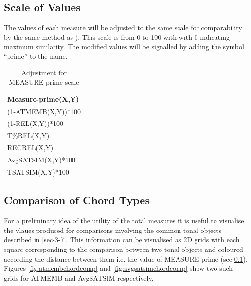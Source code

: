 \documentclass{article}
\begin{document}
\subsection{Scale of Values}
\label{sec-7-6}

The values of each measure will be adjusted to the same scale for
comparability by the same method as \citet[pp. 48]{Kuusi2001}). This
scale is from 0 to 100 with with 0 indicating maximum similarity. The
modified values will be signalled by adding the symbol ``prime'' to the
name.
\begin{table}[htb]
\caption{Adjustment for MEASURE-prime scale} 
\begin{center}
\begin{tabular}{l}
 Measure-prime(X,Y)   \\
\hline
 (1-ATMEMB(X,Y))*100  \\
 (1-REL(X,Y))*100     \\
 T\%REL(X,Y)          \\
 RECREL(X,Y)          \\
 AvgSATSIM(X,Y)*100   \\
 TSATSIM(X,Y)*100     \\
\end{tabular}
\end{center}
\end{table}

\subsection{Comparison of Chord Types}
\label{sec-7-7}

For a preliminary idea of the utility of the total measures it is
useful to visualise the vlaues produced for comparisons involving the
common tonal objects described in \ref{sec-3-7}. This information
can be visualised as 2D grids with each square corresponding to the
comparison between two tonal objects and coloured according the
distance between them i.e. the value of MEASURE-prime (see \ref{sec-7-6}). Figures \ref{fig:atmembchordcomp} and
\ref{fig:avgsatsimchordcomp} show two such grids for ATMEMB and
AvgSATSIM respectively.
\end{document}
